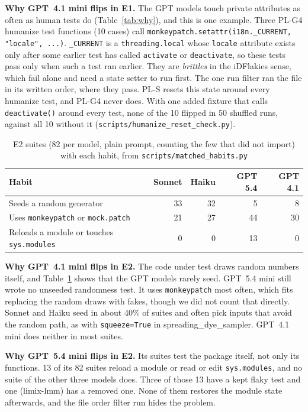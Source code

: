\documentclass[sigconf,nonacm]{acmart}
\begin{document}
\textbf{Why GPT~4.1 mini flips in E1.} The GPT models touch private attributes as often as human tests do (Table~\ref{tab:why}), and this is one example. Three PL-G4 humanize test functions (10 cases) call \texttt{monkeypatch.setattr(i18n.\_CURRENT, "locale", ...)}. \texttt{\_CURRENT} is a \texttt{threading.local} whose \texttt{locale} attribute exists only after some earlier test has called \texttt{activate} or \texttt{deactivate}, so these tests pass only when such a test ran earlier. They are \emph{brittles} in the iDFlakies sense, which fail alone and need a state setter to run first. The one run filter ran the file in its written order, where they pass. PL-S resets this state around every humanize test, and PL-G4 never does. With one added fixture that calls \texttt{deactivate()} around every test, none of the 10 flipped in 50 shuffled runs, against all 10 without it (\texttt{scripts/humanize\_reset\_check.py}).

\begin{table}[h]
\caption{E2 suites (82 per model, plain prompt, counting the few that did not import) with each habit, from \texttt{scripts/matched\_habits.py}}
\label{tab:habits}
\small
\setlength{\tabcolsep}{4pt}
\begin{tabularx}{\columnwidth}{Xrrrr}
\toprule
Habit & Sonnet & Haiku & GPT 5.4 & GPT 4.1 \\
\midrule
Seeds a random generator & 33 & 32 & 5 & 8 \\
Uses \texttt{monkeypatch} or \texttt{mock.patch} & 21 & 27 & 44 & 30 \\
Reloads a module or touches \texttt{sys.modules} & 0 & 0 & 13 & 0 \\
\bottomrule
\end{tabularx}
\end{table}

\textbf{Why GPT~4.1 mini flips in E2.} The code under test draws random numbers itself, and Table~\ref{tab:habits} shows that the GPT models rarely seed. GPT~5.4 mini still wrote no unseeded randomness test. It uses \texttt{monkeypatch} most often, which fits replacing the random draws with fakes, though we did not count that directly. Sonnet and Haiku seed in about 40\% of suites and often pick inputs that avoid the random path, as with \texttt{squeeze=True} in spreading\_dye\_sampler. GPT~4.1 mini does neither in most suites.

\textbf{Why GPT~5.4 mini flips in E2.} Its suites test the package itself, not only its functions. 13 of its 82 suites reload a module or read or edit \texttt{sys.modules}, and no suite of the other three models does. Three of those 13 have a kept flaky test and one (limix-lmm) has a removed one. None of them restores the module state afterwards, and the file order filter run hides the problem.
\end{document}
